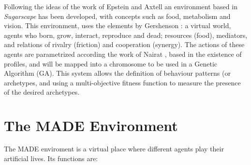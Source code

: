 \documentclass[runningheads]{llncs}
\begin{document}
Following the ideas of the work of Epstein and Axtell \cite{epstein1996growing} an environment based in {\em Sugarscape} has been developed, with concepts such as food, metabolism and vision. This environment, uses the elements  by Gershenson \cite{gershenson2005general}: a virtual world, agents who born, grow, interact, reproduce and dead; resources (food), mediators, and relations of rivalry (friction) and cooperation (synergy). The actions of these agents are parametrized according the work of Nairat \cite{nairat2011character}, based in the existence of profiles, and will be mapped into a chromosome to be used in a Genetic Algorithm (GA). This system allows the definition of behaviour patterns (or archetypes, and using a multi-objective fitness function to measure the presence of the desired archetypes. %



\section{The MADE Environment}
\label{sec:made}

The MADE enviroment is a virtual place where different agents play their artificial lives. Its functions are:
\end{document}
